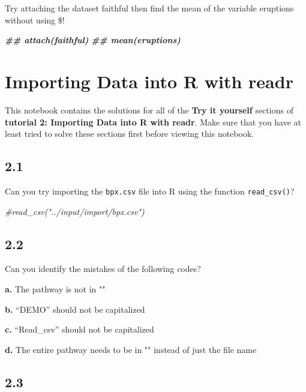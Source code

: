 \documentclass[
]{book}
\newenvironment{Shaded}{\begin{snugshade}}{\end{snugshade}}
\newcommand{\CommentTok}[1]{\textcolor[rgb]{0.56,0.35,0.01}{\textit{#1}}}
\newcommand{\DocumentationTok}[1]{\textcolor[rgb]{0.56,0.35,0.01}{\textbf{\textit{#1}}}}
\begin{document}
Try attaching the dataset faithful then find the mean of the variable eruptions without using \$!

\begin{Shaded}
\begin{Highlighting}[]
\DocumentationTok{\#\# attach(faithful)}
\DocumentationTok{\#\# mean(eruptions)}
\end{Highlighting}
\end{Shaded}

\hypertarget{importing-data-into-r-with-readr-1}{%
\section{Importing Data into R with readr}\label{importing-data-into-r-with-readr-1}}

This notebook contains the solutions for all of the \textbf{Try it yourself} sections of \textbf{tutorial 2: Importing Data into R with readr}. Make sure that you have at least tried to solve these sections first before viewing this notebook.

\hypertarget{section-9}{%
\subsection{2.1}\label{section-9}}

Can you try importing the \texttt{bpx.csv} file into R using the function \texttt{read\_csv()}?

\begin{Shaded}
\begin{Highlighting}[]
\CommentTok{\#read\_csv("../input/import/bpx.csv")}
\end{Highlighting}
\end{Shaded}

\hypertarget{section-10}{%
\subsection{2.2}\label{section-10}}

Can you identify the mistakes of the following codes?

\textbf{a.} The pathway is not in ""

\textbf{b.} ``DEMO'' should not be capitalized

\textbf{c.} ``Read\_csv'' should not be capitalized

\textbf{d.} The entire pathway needs to be in "" instead of just the file name

\hypertarget{section-11}{%
\subsection{2.3}\label{section-11}}
\end{document}
